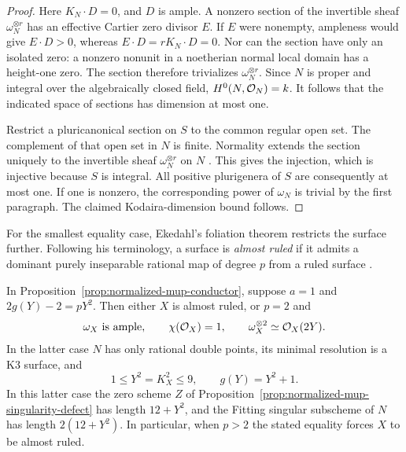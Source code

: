 \begin{proof}
Here $K_N\cdot D=0$, and $D$ is ample. A nonzero section of the
invertible sheaf $\omega_N^{\otimes r}$ has an effective Cartier
zero divisor $E$. If $E$ were nonempty, ampleness would give
$E\cdot D>0$, whereas $E\cdot D=rK_N\cdot D=0$.
Nor can the section have only an isolated zero: a nonzero nonunit
in a noetherian normal local domain has a height-one zero.
The section therefore trivializes $\omega_N^{\otimes r}$.
Since $N$ is proper and integral over the algebraically closed
field, $H^0(N,\mathcal O_N)=k$. It follows that the indicated space of
sections has dimension at most one.

Restrict a pluricanonical section on $S$ to the common regular
open set. The complement of that open set in $N$ is finite.
Normality extends the section uniquely to the invertible sheaf
$\omega_N^{\otimes r}$ on $N$ \cite[Tag 0AY7]{Stacks}.
This gives the injection, which is injective because $S$ is
integral. All positive plurigenera of $S$ are consequently at
most one. If one is nonzero, the corresponding power of
$\omega_N$ is trivial by the first paragraph. The claimed
Kodaira-dimension bound follows.
\end{proof}

For the smallest equality case, Ekedahl's foliation theorem
restricts the surface further. Following his terminology, a surface
is \emph{almost ruled} if it admits a dominant purely inseparable
rational map of degree $p$ from a ruled surface
\cite[p.~108]{EkedahlCanonical}.

\begin{proposition}\label{prop:normalized-mup-ekedahl}
In Proposition~\ref{prop:normalized-mup-conductor}, suppose $a=1$
and $2g(Y)-2=pY^2$. Then either $X$ is almost ruled, or $p=2$ and
\[
 \omega_X\text{ is ample},\qquad
 \chi(\mathcal O_X)=1,\qquad
 \omega_X^{\otimes2}\simeq\mathcal O_X(2Y).
\]
In the latter case $N$ has only rational double points, its minimal
resolution is a K3 surface, and
\[
 1\leq Y^2=K_X^2\leq9,\qquad g(Y)=Y^2+1.
\]
In this latter case the zero scheme $Z$ of
Proposition~\ref{prop:normalized-mup-singularity-defect} has length
$12+Y^2$, and the Fitting singular subscheme of $N$ has length
$2(12+Y^2)$. In particular, when $p>2$ the stated equality forces
$X$ to be almost ruled.
\end{proposition}

